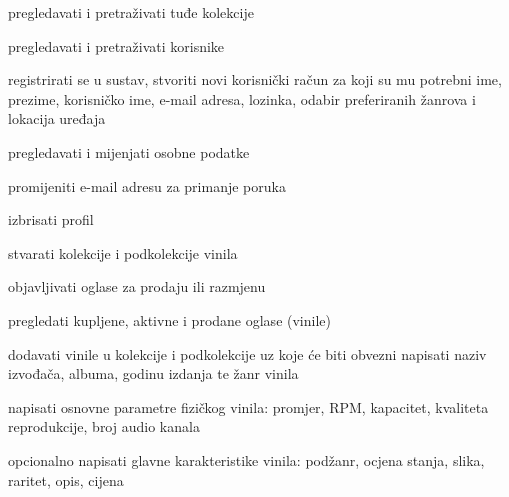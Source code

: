 			\begin{packed_enum}
			
				\item  {}
				
				\begin{packed_enum}
				
					\item pregledavati i pretraživati tuđe kolekcije
					\item pregledavati i pretraživati korisnike
					\item registrirati se u sustav, stvoriti novi korisnički račun za koji su mu potrebni ime, prezime, korisničko ime, e-mail adresa, lozinka, odabir preferiranih žanrova i lokacija uređaja
					
				\end{packed_enum}
			
				\item  {}
				
				\begin{packed_enum}
				
					\item pregledavati i mijenjati osobne podatke
					
						\begin{packed_enum}
						
								\item promijeniti e-mail adresu za primanje poruka
								
						\end{packed_enum}
						
					\item izbrisati profil
					\item stvarati kolekcije i podkolekcije vinila
					\item objavljivati oglase za prodaju ili razmjenu
					\item pregledati kupljene, aktivne i prodane oglase (vinile)
					\item dodavati vinile u kolekcije i podkolekcije uz koje će biti obvezni napisati naziv izvođača, albuma, godinu izdanja te žanr vinila
					
					\begin{packed_enum}
					
						\item napisati osnovne parametre fizičkog vinila: promjer, RPM, kapacitet, kvaliteta reprodukcije, broj audio kanala
						\item opcionalno napisati glavne karakteristike vinila: podžanr, ocjena stanja, slika, raritet, opis, cijena 
						

\end{packed_enum}
\end{packed_enum}
\end{packed_enum}
